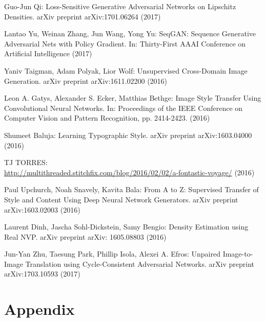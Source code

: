 \documentclass{article}
\begin{document}
\begin{thebibliography}{}
Guo-Jun Qi: Loss-Sensitive Generative Adversarial Networks
on Lipschitz Densities. arXiv preprint arXiv:1701.06264 (2017)


Lantao Yu, Weinan Zhang, Jun Wang, Yong Yu: SeqGAN: Sequence Generative Adversarial Nets with Policy Gradient. In: Thirty-First AAAI Conference on Artificial Intelligence (2017)

Yaniv Taigman, Adam Polyak, Lior Wolf: Unsupervised Cross-Domain Image Generation. arXiv preprint arXiv:1611.02200 (2016)


Leon A. Gatys, Alexander S. Ecker, Matthias Bethge: Image Style Transfer Using Convolutional Neural Networks. In: Proceedings of the IEEE Conference on Computer Vision and Pattern Recognition, pp. 2414-2423. (2016)

Shumeet Baluja: Learning Typographic Style. arXiv preprint arXiv:1603.04000 (2016)

TJ TORRES: \\
\url{http://multithreaded.stitchfix.com/blog/2016/02/02/a-fontastic-voyage/} (2016)

Paul Upchurch, Noah Snavely, Kavita Bala: From A to Z: Supervised Transfer of Style and Content Using Deep Neural Network Generators. arXiv preprint arXiv:1603.02003 (2016)

Laurent Dinh, Jascha Sohl-Dickstein, Samy Bengio: Density Estimation using Real NVP. arXiv preprint arXiv: 1605.08803 (2016)

Jun-Yan Zhu, Taesung Park, Phillip Isola, Alexei A. Efros: Unpaired Image-to-Image Translation using Cycle-Consistent Adversarial Networks. arXiv preprint arXiv:1703.10593 (2017)


\end{thebibliography}

\newpage
\section*{Appendix}
\end{document}
